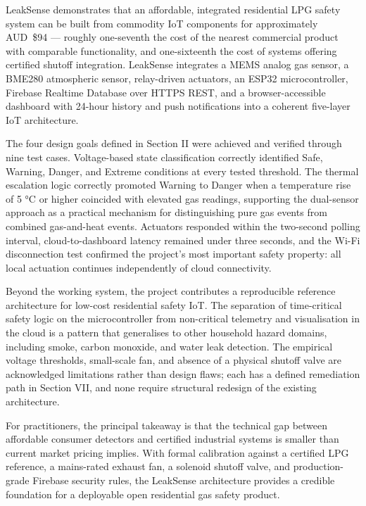 \documentclass[a4paper,10pt,conference,onecolumn]{IEEEtran}
\begin{document}
LeakSense demonstrates that an affordable, integrated residential LPG safety system 
can be built from commodity IoT components for approximately AUD~\$94 — roughly one-seventh 
the cost of the nearest commercial product with comparable functionality, and one-sixteenth the cost 
of systems offering certified shutoff integration. LeakSense integrates a MEMS analog gas sensor, 
a BME280 atmospheric sensor, relay-driven actuators, an ESP32 microcontroller, Firebase Realtime Database 
over HTTPS REST, and a browser-accessible dashboard with 24-hour history and push notifications into a coherent five-layer IoT architecture.

The four design goals defined in Section II were achieved and verified through 
nine test cases. Voltage-based state classification correctly identified Safe, 
Warning, Danger, and Extreme conditions at every tested threshold. The thermal escalation 
logic correctly promoted Warning to Danger when a temperature rise of 5 °C or higher 
coincided with elevated gas readings, supporting the dual-sensor approach as a practical 
mechanism for distinguishing pure gas events from combined gas-and-heat events. 
Actuators responded within the two-second polling interval, cloud-to-dashboard 
latency remained under three seconds, and the Wi-Fi disconnection test confirmed 
the project's most important safety property: all local actuation continues 
independently of cloud connectivity.

Beyond the working system, the project contributes a reproducible reference architecture 
for low-cost residential safety IoT. The separation of time-critical safety logic on the 
microcontroller from non-critical telemetry and visualisation in the cloud is a pattern 
that generalises to other household hazard domains, including smoke, carbon monoxide, 
and water leak detection. The empirical voltage thresholds, small-scale fan, and absence 
of a physical shutoff valve are acknowledged limitations rather than design flaws; each has 
a defined remediation path in Section VII, and none require structural redesign of the existing architecture.


For practitioners, the principal takeaway is that the technical gap between affordable 
consumer detectors and certified industrial systems is smaller than current market pricing 
implies. With formal calibration against a certified LPG reference, a mains-rated exhaust fan, 
a solenoid shutoff valve, and production-grade Firebase security rules, the LeakSense architecture 
provides a credible foundation for a deployable open residential gas safety product.
\end{document}

